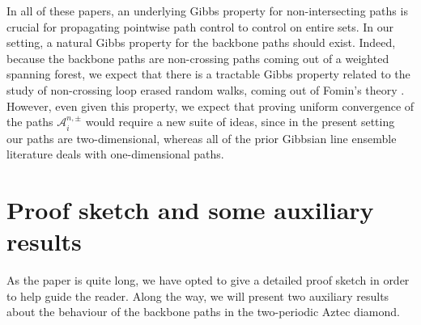 \documentclass[11pt,twoside]{amsart}
\theoremstyle{plain}
\numberwithin{quest}{section}
\theoremstyle{remark}
\numberwithin{rem}{section}
\theoremstyle{definition}
\newcommand{\cA}{\mathcal{A}}
\begin{document}
    In all of these papers, an underlying Gibbs property for non-intersecting paths is crucial for propagating pointwise path control to control on entire sets. In our setting, a natural Gibbs property for the backbone paths should exist. Indeed, because the backbone paths are non-crossing paths coming out of a weighted spanning forest, we expect that there is a tractable Gibbs property related to the study of non-crossing loop erased random walks, coming out of Fomin's theory \cite{fomin2001loop}. However, even given this property, we expect that proving uniform convergence of the paths $\cA_i^{n, \pm}$ would require a new suite of ideas, since in the present setting our paths are two-dimensional, whereas all of the prior Gibbsian line ensemble literature deals with one-dimensional paths.
	
	\section{Proof sketch and some auxiliary results}
	\label{sec:proof-sketch}
	As the paper is quite long, we have opted to give a detailed proof sketch in order to help guide the reader. Along the way, we will present two auxiliary results about the behaviour of the backbone paths in the two-periodic Aztec diamond. 
	
	
\end{document}

